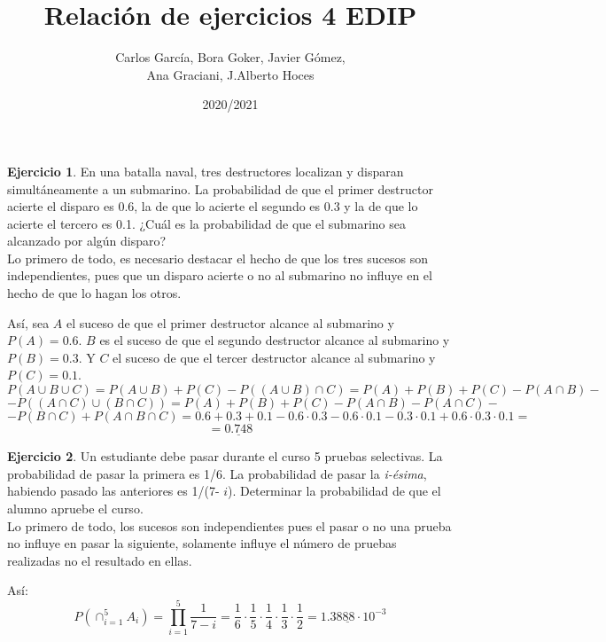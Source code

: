 \documentclass[a4paper, 12pt]{article}
\title{\textbf{Relación de ejercicios 4 EDIP}}
\author{Carlos García, Bora Goker, Javier Gómez,  \\ Ana Graciani, J.Alberto Hoces}
\date{2020/2021}
\theoremstyle{definition}
\newtheorem{ej}{Ejercicio}
\begin{document}
\maketitle

\begin{ej}
En una batalla naval, tres destructores localizan y disparan simultáneamente a un submarino. La probabilidad de que el primer destructor acierte el disparo es 0.6, la de que lo acierte el segundo es 0.3 y la de que lo acierte el tercero es 0.1. ¿Cuál es la probabilidad de que el submarino sea alcanzado por algún disparo? \\

Lo primero de todo, es necesario destacar el hecho de que los tres sucesos son independientes, pues que un disparo acierte o no al submarino no influye en el hecho de que lo hagan los otros. 

Así, sea \(A\) el suceso de que el primer destructor alcance al submarino y \(P(A) = 0.6\). \(B\) es el suceso de que el segundo destructor alcance al submarino y \(P(B) = 0.3\). Y \(C\) el suceso de que el tercer destructor alcance al submarino y \(P(C) = 0.1\).
\[
	P(A \cup B \cup C) = P(A \cup B) + P(C) - P((A \cup B) \cap C) = P(A) + P(B) + P(C) - P(A \cap B) -
\]
\[
	- P((A\cap C) \cup (B \cap C)) = P(A) + P(B) + P(C) - P(A \cap B) - P(A \cap C) - 
\]
\[
	- P(B \cap C) + P(A \cap B \cap C) = 0.6 + 0.3 + 0.1 - 0.6 \cdot 0.3 - 0.6 \cdot 0.1 - 0.3 \cdot 0.1 + 0.6 \cdot 0.3 \cdot 0.1 =
\]
\[
	= \underline{0.748}
\]

\end{ej}

\bigskip

\begin{ej}
Un estudiante debe pasar durante el curso 5 pruebas selectivas. La probabilidad de pasar la primera es 1/6. La probabilidad de pasar la \textit{i-ésima}, habiendo pasado las anteriores es 1/(7- \(i\)). Determinar la probabilidad de que el alumno apruebe el curso. \\

Lo primero de todo, los sucesos son independientes pues el pasar o no una prueba no influye en pasar la siguiente, solamente influye el número de pruebas realizadas no el resultado en ellas.

Así:
\[
	P \left( \cap_{i=1}^{5} A_i \right) = \prod_{i=1}^{5} \frac{1}{7-i} = \frac{1}{6} \cdot \frac{1}{5} \cdot \frac{1}{4} \cdot \frac{1}{3} \cdot \frac{1}{2} = \underline{1.3888 \cdot 10}^{-3}
\]
\end{ej}
\end{document}
